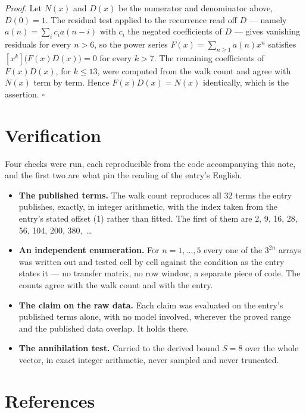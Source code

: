 \documentclass[11pt]{article}
\theoremstyle{definition}
\begin{document}
{\itshape Proof.} Let $N(x)$ and $D(x)$ be the numerator and denominator above, $D(0)=1$. The residual test applied to the recurrence read off $D$ --- namely $a(n) = \sum_i c_i a(n-i)$ with $c_i$ the negated coefficients of $D$ --- gives vanishing residuals for every $n > 6$, so the power series $F(x)=\sum_{n\ge 1}a(n)x^n$ satisfies $[x^k]\bigl(F(x)D(x)\bigr) = 0$ for every $k > 7$. The remaining coefficients of $F(x)D(x)$, for $k \le 13$, were computed from the walk count and agree with $N(x)$ term by term. Hence $F(x)D(x) = N(x)$ identically, which is the assertion. $\square$

\section{Verification}

Four checks were run, each reproducible from the code accompanying this note, and the first two are what pin the reading of the entry's English.

\begin{itemize}

\item {\bfseries The published terms.} The walk count reproduces all 32 terms the entry publishes, exactly, in integer arithmetic, with the index taken from the entry's stated offset (1) rather than fitted. The first of them are 2, 9, 16, 28, 56, 104, 200, 380,~\dots

\item {\bfseries An independent enumeration.} For $n = 1,\dots,5$ every one of the $3^{2n}$ arrays was written out and tested cell by cell against the condition as the entry states it --- no transfer matrix, no row window, a separate piece of code. The counts agree with the walk count and with the entry.

\item {\bfseries The claim on the raw data.} Each claim was evaluated on the entry's published terms alone, with no model involved, wherever the proved range and the published data overlap. It holds there.

\item {\bfseries The annihilation test.} Carried to the derived bound $S = 8$ over the whole vector, in exact integer arithmetic, never sampled and never truncated.

\end{itemize}

\section{References}
\end{document}
